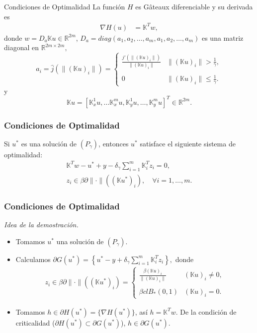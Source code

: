 \documentclass{beamer}
\begin{document}
\begin{frame}{Condiciones de Optimalidad}
La función $H$ es Gâteaux diferenciable y su derivada es 
    \begin{align*}
   \nabla H(u)&=\mathbb{K}^Tw,
  \end{align*}
  donde $w=D_a\mathbb{K}u\in\mathbb{R}^{2m}$, $D_a=diag(a_1,a_2,\ldots,a_m,a_1,a_2,\ldots,a_m)$ es una matriz diagonal en $\mathbb{R}^{2m\times 2m},$ 
  \begin{equation*}
  a_i=\hat{j}(\|(\mathbb{K}u)_i\|)=\left\{\begin{array}{ll}
    \displaystyle \frac{j'(\|(\mathbb{K}u)_i\|)}{\|(\mathbb{K}u)_i\|}&\|(\mathbb{K}u)_i\|>\frac{1}{\gamma},\\\\
    0&\|(\mathbb{K}u)_i\|\leq \frac{1}{\gamma}.
  \end{array}\right.
  \end{equation*} y $$\mathbb{K}u=[\mathbb{K}_x^1u,\ldots \mathbb{K}_x^mu,\mathbb{K}_y^1u,\ldots,\mathbb{K}_y^mu]^T\in \mathbb{R}^{2m}.$$
\end{frame}
\begin{frame}
\frametitle{Condiciones de Optimalidad}
Si $u^*$ es una solución de $(P_\gamma)$, entonces $u^*$ satisface el siguiente sistema de optimalidad: 
\begin{align*}
    \mathbb{K}^Tw-u^*+y-\delta_{\gamma}\sum_{i=1}^m\mathbb{K}_i^Tz_i=0,\\
    z_i \in \beta\partial\|\cdot\|((\mathbb{K}u^*)_i), \quad \forall i=1,\ldots,m.
\end{align*}
\end{frame}
\begin{frame}
\frametitle{Condiciones de Optimalidad}
\textit{Idea de la demostración.}
\begin{itemize}
    \justifying
    \item Tomamos $u^*$ una solución de $(P_{\gamma})$.
    \item Calculamos $\partial G(u^*)=\left\{u^*-y+\delta_{\gamma}\displaystyle\sum_{i=1}^m \mathbb{K}_i^T z_i\right\},$ donde
 \begin{align*}
z_i\in \beta\partial\|\cdot\|((\mathbb{K}u^*)_i)=\left\{\begin{array}{ll}
\displaystyle\frac{\beta(\mathbb{K}u)_i}{\|(\mathbb{K}u)_i\|}& (\mathbb{K}u)_i\neq 0, \\\\
             \beta clB_*(0,1)& (\mathbb{K}u)_i=0.
        \end{array}\right.
 \end{align*}
\item Tomamos $h\in \partial H(u^*)=\{\nabla H(u^*)\}$, así $h=\mathbb{K}^Tw$. De la condición de criticalidad ($\partial H(u^*)\subset \partial G(u^*)$), $h\in \partial G(u^*)$.
  \end{itemize}
\end{frame}
\end{document}
